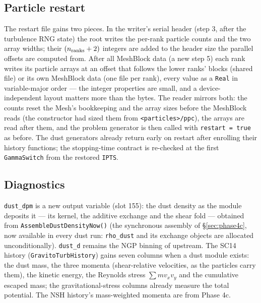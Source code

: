 \documentclass[11pt]{article}
\newcommand{\code}[1]{\texttt{#1}}
\newcommand{\fn}[1]{\texttt{\small #1}}
\begin{document}
\subsection{Particle restart}

The restart file gains two pieces. In the writer's serial header (step 3, after the
turbulence RNG state) the root writes the per-rank particle counts and the two array
widths; their $(n_{\rm ranks}+2)$ integers are added to the header size the parallel
offsets are computed from. After all MeshBlock data (a new step 5) each rank writes its
particle arrays at an offset that follows the lower ranks' blocks (shared file) or its
own MeshBlock data (one file per rank), every value as a \code{Real} in variable-major
order --- the integer properties are small, and a device-independent layout matters more
than the bytes. The reader mirrors both: the counts reset the Mesh's bookkeeping and the
array sizes before the MeshBlock reads (the constructor had sized them from
\code{<particles>/ppc}), the arrays are read after them, and the problem generator is
then called with \code{restart = true} as before. The dust generators already return
early on restart after enrolling their history functions; the stopping-time contract is
re-checked at the first \fn{GammaSwitch} from the restored \code{IPTS}.

\subsection{Diagnostics}

\code{dust\_dpm} is a new output variable (slot 155): the dust density as the module
deposits it --- its kernel, the additive exchange and the shear fold --- obtained from
\fn{AssembleDustDensityNow()} (the synchronous assembly of \S\ref{sec:phase4c}, now
available in every dust run: \code{rho\_dust} and its exchange objects are allocated
unconditionally). \code{dust\_d} remains the NGP binning of upstream. The SC14 history
(\fn{GravitoTurbHistory}) gains seven columns when a dust module exists: the dust mass,
the three momenta (shear-relative velocities, as the particles carry them), the kinetic
energy, the Reynolds stress $\sum m v_x v_y$ and the cumulative escaped mass; the
gravitational-stress columns already measure the total potential. The NSH history's
mass-weighted momenta are from Phase 4c.
\end{document}
